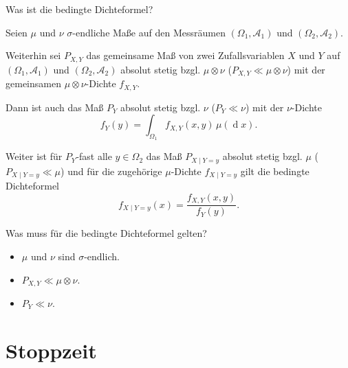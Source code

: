 \begin{QandA}
    \item Was ist die bedingte Dichteformel?
    \begin{answered}
        Seien $\mu$ und $\nu$ $\sigma$-endliche Maße auf den Messräumen $(\Omega_1, \mathcal{A}_1)$ und $(\Omega_2, \mathcal{A}_2)$.

        Weiterhin sei $P_{X,Y}$ das gemeinsame Maß von zwei Zufallsvariablen $X$ und $Y$ auf $(\Omega_1, \mathcal{A}_1)$ und $(\Omega_2, \mathcal{A}_2)$ absolut stetig bzgl. $\mu \otimes \nu$ ($P_{X,Y} \ll \mu \otimes \nu$) mit der gemeinsamen $\mu \otimes \nu$-Dichte $f_{X,Y}$.

        Dann ist auch das Maß $P_Y$ absolut stetig bzgl. $\nu$ ($P_Y \ll \nu$) mit der $\nu$-Dichte
        \[
            f_Y(y) = \int_{\Omega_1} f_{X,Y}(x,y) \, \mu(\operatorname{d}x).
        \]

        Weiter ist für $P_Y$-fast alle $y \in \Omega_2$ das Maß $P_{X\mid Y=y}$ absolut stetig bzgl. $\mu$ ($P_{X\mid Y=y} \ll \mu$) und für die zugehörige $\mu$-Dichte $f_{X\mid Y=y}$ gilt die bedingte Dichteformel
        \begin{equation}
            \tag{Bedingte Dichteformel}
            f_{X\mid Y=y}(x) = \frac{f_{X,Y}(x,y)}{f_Y(y)}.
        \end{equation}
    \end{answered}

    \item Was muss für die bedingte Dichteformel gelten?
    \begin{answered}
        \begin{itemize}
            \item $\mu$ und $\nu$ sind $\sigma$-endlich.
            \item $P_{X,Y} \ll \mu \otimes \nu$.
            \item $P_Y \ll \nu$.
        \end{itemize}
    \end{answered}
\end{QandA}

\newpage
\section*{Stoppzeit}

